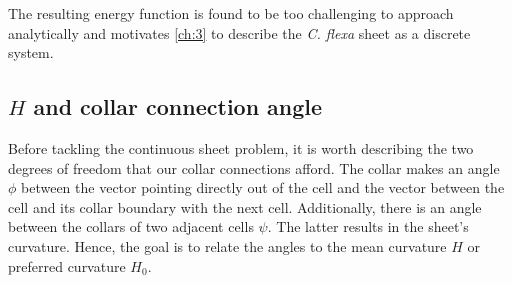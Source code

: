 The resulting energy function is found to be too challenging to approach analytically and motivates \cref{ch:3} to describe the \textit{C. flexa} sheet as a discrete system.

\subsection{$H$ and collar connection angle} \label{subsec:h_phi}


Before tackling the continuous sheet problem, it is worth describing the two degrees of freedom that our collar connections afford. 
The collar makes an angle $\phi$ between the vector pointing directly out of the cell and the vector between the cell and its collar boundary with the next cell. 
Additionally, there is an angle between the collars of two adjacent cells $\psi$. 
The latter results in the sheet's curvature. 
Hence, the goal is to relate the angles to the mean curvature $H$ or preferred curvature $H_0$.


